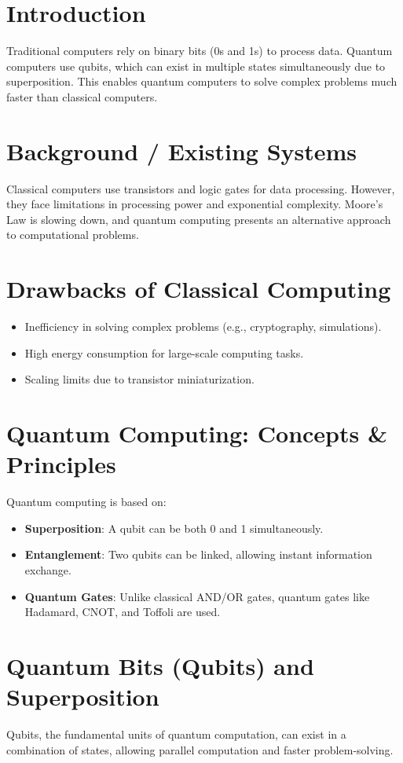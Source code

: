 \documentclass[a4paper,12pt]{article}
\begin{document}
\section{Introduction}
Traditional computers rely on binary bits (0s and 1s) to process data. Quantum computers use qubits, which can exist in multiple states simultaneously due to superposition. This enables quantum computers to solve complex problems much faster than classical computers.

\section{Background / Existing Systems}
Classical computers use transistors and logic gates for data processing. However, they face limitations in processing power and exponential complexity. Moore’s Law is slowing down, and quantum computing presents an alternative approach to computational problems.

\section{Drawbacks of Classical Computing}
\begin{itemize}
    \item Inefficiency in solving complex problems (e.g., cryptography, simulations).
    \item High energy consumption for large-scale computing tasks.
    \item Scaling limits due to transistor miniaturization.
\end{itemize}

\section{Quantum Computing: Concepts \& Principles}
Quantum computing is based on:
\begin{itemize}
    \item \textbf{Superposition}: A qubit can be both 0 and 1 simultaneously.
    \item \textbf{Entanglement}: Two qubits can be linked, allowing instant information exchange.
    \item \textbf{Quantum Gates}: Unlike classical AND/OR gates, quantum gates like Hadamard, CNOT, and Toffoli are used.
\end{itemize}

\section{Quantum Bits (Qubits) and Superposition}
Qubits, the fundamental units of quantum computation, can exist in a combination of states, allowing parallel computation and faster problem-solving.
\end{document}
